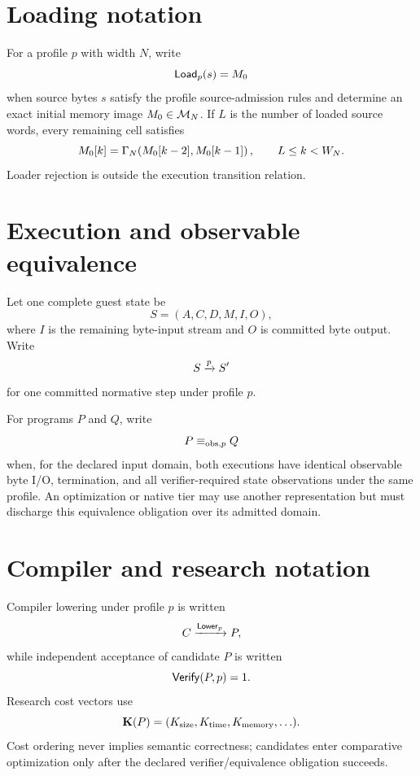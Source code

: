 \documentclass{article}
\begin{document}
\section{Loading notation}

For a profile $p$ with width $N$, write
\begin{equation}
  \mathsf{Load}_p(s)=M_0
  \label{eq:profile-load}
\end{equation}
when source bytes $s$ satisfy the profile source-admission rules and determine an
exact initial memory image $M_0\in\mathcal{M}_{N}$. If $L$ is the number of
loaded source words, every remaining cell satisfies
\begin{equation}
  M_0[k]=\Gamma_{N}\!\left(M_0[k-2],M_0[k-1]\right),
  \qquad L\leq k < W_N.
  \label{eq:profile-load-recurrence}
\end{equation}
Loader rejection is outside the execution transition relation.

\section{Execution and observable equivalence}

Let one complete guest state be
\[
  S=(A,C,D,M,I,O),
\]
where $I$ is the remaining byte-input stream and $O$ is committed byte output.
Write
\begin{equation}
  S \xrightarrow{p} S'
  \label{eq:profile-transition}
\end{equation}
for one committed normative step under profile $p$.

For programs $P$ and $Q$, write
\begin{equation}
  P\equiv_{\mathrm{obs},p}Q
  \label{eq:profile-observable-equivalence}
\end{equation}
when, for the declared input domain, both executions have identical observable
byte I/O, termination, and all verifier-required state observations under the
same profile. An optimization or native tier may use another representation but
must discharge this equivalence obligation over its admitted domain.

\section{Compiler and research notation}

Compiler lowering under profile $p$ is written
\[
  C \xrightarrow{\mathsf{Lower}_p} P,
\]
while independent acceptance of candidate $P$ is written
\[
  \mathsf{Verify}(P,p)=1.
\]
Research cost vectors use
\[
  \mathbf{K}\!\left(P\right)
    = (K_{\mathrm{size}},K_{\mathrm{time}},K_{\mathrm{memory}},\ldots).
\]
Cost ordering never implies semantic correctness; candidates enter comparative
optimization only after the declared verifier/equivalence obligation succeeds.
\end{document}
